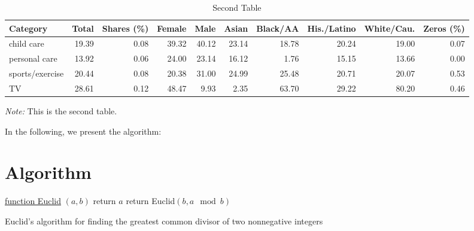 \documentclass[11pt, letterpaper]{article}
\begin{document}
\renewcommand*\arraystretch{0.95}
\renewcommand{\tabcolsep}{7.5pt}
\begin{table}[H]
  \addtocounter{table}{-1}
  \renewcommand{\thetable}{B.\arabic{table}b}
  \caption{Second Table}
  \label{summary_b}
  \fontsize{9}{11}\selectfont
  \hspace*{-0.5cm}
  \begin{tabular}{lrrrrrrrrr}
    \toprule
    Category                   & Total & Shares (\%) & Female & Male  & Asian & Black/AA & His./Latino & White/Cau. & Zeros (\%) \\ \hline
    child care                 & 19.39 & 0.08   & 39.32  & 40.12 & 23.14 & 18.78    & 20.24       & 19.00      & 0.07  \\
    personal care              & 13.92 & 0.06   & 24.00  & 23.14 & 16.12 & 1.76    & 15.15       & 13.66      & 0.00  \\
    sports/exercise            & 20.44 & 0.08   & 20.38  & 31.00 & 24.99 & 25.48    & 20.71       & 20.07      & 0.53  \\
    TV                         & 28.61 & 0.12   & 48.47  & 9.93 & 2.35 & 63.70    & 29.22       & 80.20      & 0.46  \\ \bottomrule
  \end{tabular}
  \hspace*{-1cm}
  \begin{minipage}{1.065\textwidth}
    \onehalfspacing
    \vspace*{0.05cm}
    \begin{tablenotes}
      \footnotesize
      \item\textit{Note:} This is the second table.
    \end{tablenotes}
  \end{minipage}
\end{table}

In the following, we present the algorithm:

\section{Algorithm}
\begin{algorithm}
  
  \underline{function Euclid} $(a,b)$\;
  {
  return $a$\;
  }
  {
  return Euclid$(b,a\mod b)$\;
  }
  \caption{Euclid's algorithm for finding the greatest common divisor of two nonnegative integers}
\end{algorithm}
\end{document}
